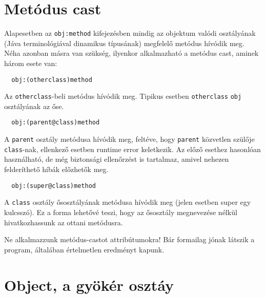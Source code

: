 \label{metcast}
\section{Metódus cast}

Alapesetben az \verb!obj:method! kifejezésben mindig az objektum valódi
osztályának (Jáva terminológiával dinamikus típusának) megfelelő
metódus hívódik meg. Néha azonban másra van szükség, ilyenkor
alkalmazható a metódus cast, aminek három esete van:
\begin{verbatim}
  obj:(otherclass)method
\end{verbatim}
Az \verb!otherclass!-beli metódus hívódik meg. 
Tipikus esetben \verb!otherclass! \verb!obj! osztályának az őse.
\begin{verbatim}
  obj:(parent@class)method
\end{verbatim}
A \verb!parent! osztály metódusa hívódik meg, feltéve, 
hogy \verb!parent! közvetlen szülője \verb!class!-nak,
ellenkező esetben runtime error keletkezik. Az előző esethez
hasonlóan használható, de még biztonsági ellenőrzést is tartalmaz,
amivel nehezen felderíthető híbák előzhetők meg.
\begin{verbatim}
  obj:(super@class)method
\end{verbatim}
A \verb!class! osztály ősosztályának metódusa hívódik meg
(jelen esetben super egy kulcsszó). 
Ez a forma lehetővé teszi, hogy az ősosztály megnevezése nélkül
hivatkozhassunk az ottani metódusra.

Ne alkalmazzunk metódus-castot attribútumokra!
Bár formailag jónak látszik a program, 
általában értelmetlen eredményt kapunk.


\section{Object, a gyökér osztáy}

